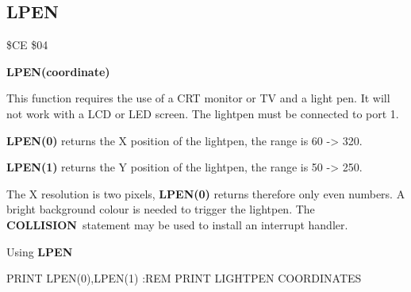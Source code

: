 \subsection{LPEN}
\begin{description}[leftmargin=3cm,style=nextline]
\item [Token:] \$CE \$04
\item [Format:] {\bf LPEN(coordinate)}
\item [Usage:] This function requires the use of a
               CRT monitor or TV and a light pen.
               It will not work with a LCD or LED screen.
               The lightpen must be connected to port 1.

               {\bf LPEN(0)} returns the X position of the lightpen,
               the range is 60 -> 320.

               {\bf LPEN(1)} returns the Y position of the lightpen,
               the range is 50 -> 250.

\item [Remarks:] The X resolution is two pixels, {\bf LPEN(0)} returns
                 therefore only even numbers.
                 A bright background colour is needed to trigger
                 the lightpen. The {\bf COLLISION} statement may
                 be used to install an interrupt handler.

\item [Example:] Using {\bf LPEN}
\begin{screenoutput}
 PRINT LPEN(0),LPEN(1)   :REM PRINT LIGHTPEN COORDINATES
\end{screenoutput}
\end{description}


\newpage
